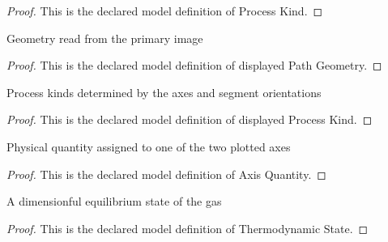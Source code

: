 \begin{proof}
  This is the declared model definition of Process Kind.
\end{proof}
\begin{definition}
  \label{def:physics:phyx-mini-0494:phyxminiproblems-problemphyxmini0494-displayedpathgeometry}
  Geometry read from the primary image
\end{definition}
\begin{proof}
  This is the declared model definition of displayed Path Geometry.
\end{proof}
\begin{definition}
  \label{def:physics:phyx-mini-0494:phyxminiproblems-problemphyxmini0494-displayedprocesskind}
  Process kinds determined by the axes and segment orientations
\end{definition}
\begin{proof}
  This is the declared model definition of displayed Process Kind.
\end{proof}
\begin{definition}
  \label{def:physics:phyx-mini-0494:phyxminiproblems-problemphyxmini0494-axisquantity}
  Physical quantity assigned to one of the two plotted axes
\end{definition}
\begin{proof}
  This is the declared model definition of Axis Quantity.
\end{proof}
\begin{definition}
  \label{def:physics:phyx-mini-0494:phyxminiproblems-problemphyxmini0494-thermodynamicstate}
  A dimensionful equilibrium state of the gas
\end{definition}
\begin{proof}
  This is the declared model definition of Thermodynamic State.
\end{proof}
